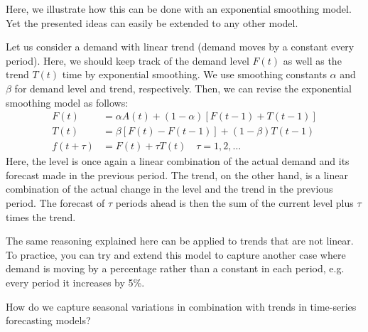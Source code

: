   \begin{solution}   
   Here, we illustrate how this can be done with an exponential smoothing model. Yet the presented ideas can easily be extended to any other model. 
 
   Let us consider a demand with linear trend (demand moves by a constant every period). Here, we should keep track of the demand level $F(t)$ as well as the trend $T(t)$ time by exponential smoothing. We use smoothing constants $\alpha$ and $\beta$ for demand level and trend, respectively. Then, we can revise the exponential smoothing model as follows:
\begin{align*}
F(t) & = \alpha A(t) + (1-\alpha) [F(t-1)+T(t-1)] \\
T(t) & = \beta [F(t)-F(t-1)] + (1-\beta) T(t-1) \\
f(t+\tau) & = F(t) + \tau T(t) \quad \tau = 1,2,\ldots
\end{align*}
Here, the level is once again a linear combination of the actual demand and its forecast made in the previous period. The trend, on the other hand, is a linear combination of the actual change in the level and the trend in the previous period. The forecast of $\tau$ periods ahead is then the sum of the current level plus $\tau$ times the trend. 

The same reasoning explained here can be applied to trends that are not linear. To practice, you can try and extend this model to capture another case where demand is moving by a percentage rather than a constant in each period, e.g. every period it increases by 5\%. 

  \end{solution}
  
\begin{question}
How do we capture seasonal variations in combination with trends in time-series forecasting models?

\end{question}

